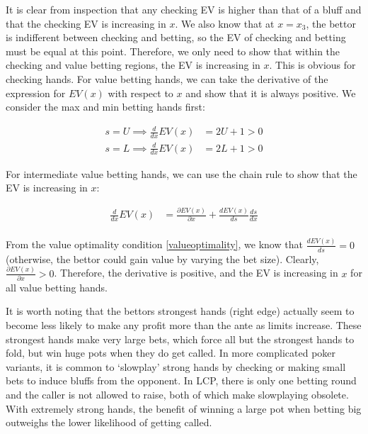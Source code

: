 \documentclass[../../main/main.tex]{subfiles}
\begin{document}
\begin{customproof}
    It is clear from inspection that any checking EV is higher than that of a bluff and that the checking EV is increasing in $x$. We also know that at $x=x_3$, the bettor is indifferent between checking and betting, so the EV of checking and betting must be equal at this point. Therefore, we only need to show that within the checking and value betting regions, the EV is increasing in $x$. This is obvious for checking hands. For value betting hands, we can take the derivative of the expression for $EV(x)$ with respect to $x$ and show that it is always positive. We consider the max and min betting hands first:
    
    \begin{align*}
        s = U \implies \frac{d}{dx} EV(x) & = 2U + 1 > 0  \\
        s = L \implies \frac{d}{dx} EV(x) & = 2L + 1 > 0 
    \end{align*}
    
    For intermediate value betting hands, we can use the chain rule to show that the EV is increasing in $x$:
    
    \begin{align*}
        \frac{d}{dx} EV(x) & = \frac{\partial EV(x)}{\partial x} + \frac{dEV(x)}{ds} \frac{d s}{d x} \\
    \end{align*}

    From the value optimality condition \ref{valueoptimality}, we know that $\frac{dEV(x)}{ds} = 0$ (otherwise, the bettor could gain value by varying the bet size). Clearly, $\frac{\partial EV(x)}{\partial x} > 0$.  Therefore, the derivative is positive, and the EV is increasing in $x$ for all value betting hands.
\end{customproof}

It is worth noting that the bettors strongest hands (right edge) actually seem to become less likely to make any profit more than the ante as limits increase. These strongest hands make very large bets, which force all but the strongest hands to fold, but win huge pots when they do get called. In more complicated poker variants, it is common to `slowplay' strong hands by checking or making small bets to induce bluffs from the opponent. In LCP, there is only one betting round and the caller is not allowed to raise, both of which make slowplaying obsolete. With extremely strong hands, the benefit of winning a large pot when betting big outweighs the lower likelihood of getting called.
\end{document}
